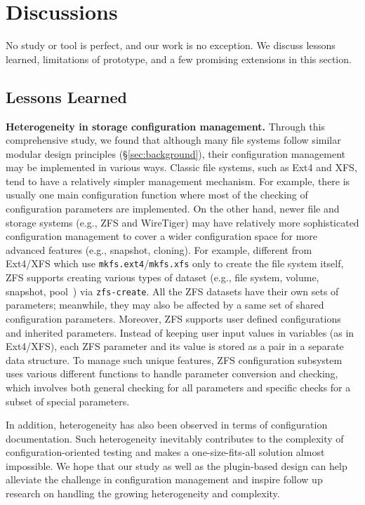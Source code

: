 \section{Discussions}
\label{sec:discussion}

 No study or tool is perfect, and our work is no exception. We discuss lessons learned,  limitations of \prj prototype, and a few promising extensions in this section.

 
\subsection{Lessons Learned}
\noindent
\textbf{Heterogeneity in storage configuration  management.}
Through this comprehensive study, we found that
although many file systems follow similar modular design principles (\S\ref{sec:background}), 
their configuration management may be implemented in various ways. Classic file systems, such as Ext4 and XFS, tend to have a relatively simpler management mechanism. For example, there is usually one main configuration function where most of the checking of configuration parameters are implemented. On the other hand, newer file and storage systems (e.g., ZFS and WireTiger) may have relatively more sophisticated  configuration management to cover a wider configuration space for more advanced features (e.g., snapshot, cloning).
For example, different from Ext4/XFS which  use \texttt{mkfs.ext4}/\texttt{mkfs.xfs} only to create the file system itself, 
ZFS supports creating various types of dataset (e.g.,  file system, volume, snapshot,  pool~\cite{zfs}) via  \texttt{zfs-create}.
All the ZFS datasets have their own sets of parameters; meanwhile, they may also be affected by a same set of shared configuration parameters.  Moreover, ZFS supports user defined configurations and inherited parameters. Instead of keeping user input values in variables (as in Ext4/XFS),  each ZFS parameter and its value is stored as a pair in a separate data structure. To manage such unique features, ZFS configuration subsystem uses various different functions to handle parameter conversion and checking, which involves both general checking for all parameters and  specific checks for a subset of special parameters.

In addition,  heterogeneity has also been observed in terms of configuration documentation. 
Such heterogeneity inevitably contributes to the complexity of configuration-oriented
testing and makes a one-size-fits-all solution almost impossible.
We hope that  our study as well as the plugin-based \prj design can help alleviate the challenge in configuration management and inspire follow up research on handling the growing heterogeneity and complexity.

